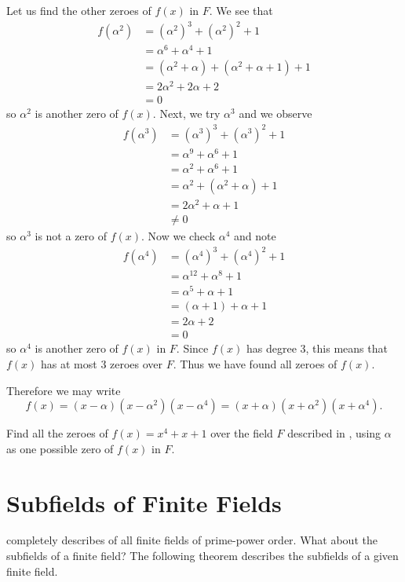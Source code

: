 \begin{example}
    Let us find the other zeroes of $f(x)$ in $F$. We see that
    \begin{align*}
        f(\alpha^2) &= (\alpha^2)^3 + (\alpha^2)^2 + 1\\
        &= \alpha^6 + \alpha^4 + 1\\
        &= (\alpha^2 + \alpha) + (\alpha^2 + \alpha + 1) + 1\\
        &= 2\alpha^2 + 2\alpha + 2\\
        &= 0
    \end{align*}
    so $\alpha^2$ is another zero of $f(x)$. Next, we try $\alpha^3$ and we observe
    \begin{align*}
        f(\alpha^3) &= (\alpha^3)^3 + (\alpha^3)^2 + 1\\
        &= \alpha^9 + \alpha^6 + 1\\
        &= \alpha^2 + \alpha^6 + 1\\
        &= \alpha^2 + (\alpha^2 + \alpha) + 1\\
        &= 2\alpha^2 + \alpha + 1\\
        &\neq 0
    \end{align*}
    so $\alpha^3$ is not a zero of $f(x)$. Now we check $\alpha^4$ and note
    \begin{align*}
        f(\alpha^4) &= (\alpha^4)^3 + (\alpha^4)^2 + 1\\
        &= \alpha^{12} + \alpha^8 + 1\\
        &= \alpha^5 + \alpha + 1\\
        &= (\alpha + 1) + \alpha + 1\\
        &= 2\alpha + 2\\
        &= 0
    \end{align*}
    so $\alpha^4$ is another zero of $f(x)$ in $F$. Since $f(x)$ has degree 3, this means that $f(x)$ has at most 3 zeroes over $F$. Thus we have found all zeroes of $f(x)$.

    Therefore we may write
    \[
        f(x) = (x - \alpha)(x - \alpha^2)(x - \alpha^4) = (x + \alpha)(x + \alpha^2)(x + \alpha^4).
    \]
\end{example}

\begin{exercise}
    Find all the zeroes of $f(x) = x^4 + x + 1$ over the field $F$ described in , using $\alpha$ as one possible zero of $f(x)$ in $F$.
\end{exercise}

\section{Subfields of Finite Fields}
 completely describes of all finite fields of prime-power order. What about the subfields of a finite field? The following theorem describes the subfields of a given finite field.

